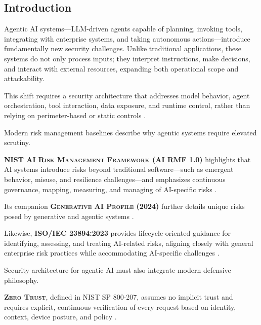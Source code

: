 \begin{TNtwocol}

      \section{Introduction}

      Agentic AI systems—LLM-driven agents capable of planning, invoking tools, integrating with enterprise systems, and taking autonomous actions—introduce fundamentally new security challenges. Unlike traditional applications, these systems do not only process inputs; they interpret instructions, make decisions, and interact with external resources, expanding both operational scope and attackability.

      This shift requires a security architecture that addresses model behavior, agent orchestration, tool interaction, data exposure, and runtime control, rather than relying on perimeter-based or static controls \cite{NIST_AI_RMF_100_1}.

      \vspace{1em}

      Modern risk management baselines describe why agentic systems require elevated scrutiny.

      \textbf{\textsc{NIST AI Risk Management Framework (AI RMF 1.0)}} highlights that AI systems introduce risks beyond traditional software—such as emergent behavior, misuse, and resilience challenges—and emphasizes continuous governance, mapping, measuring, and managing of AI-specific risks \cite{NIST_AI_RMF_100_1}.

      Its companion \textbf{\textsc{Generative AI Profile (2024)}} further details unique risks posed by generative and agentic systems \cite{NIST_GenAI_Profile_600_1}.

      Likewise, \textbf{\textsc{ISO/IEC 23894:2023}} provides lifecycle-oriented guidance for identifying, assessing, and treating AI-related risks, aligning closely with general enterprise risk practices while accommodating AI-specific challenges \cite{ISO_23894_2023}.

      \vspace{1em}

      Security architecture for agentic AI must also integrate modern defensive philosophy.

      \textbf{\textsc{Zero Trust}}, defined in \textsc{NIST SP 800-207}, assumes no implicit trust and requires explicit, continuous verification of every request based on identity, context, device posture, and policy \cite{NIST_SP800_207}.


\end{TNtwocol}

